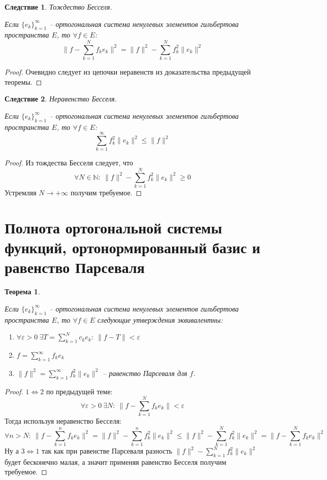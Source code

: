 \documentclass[a4paper,12pt]{article}
\renewcommand{\leq}{\ensuremath{\leqslant}}
\renewcommand{\geq}{\ensuremath{\geqslant}}
\theoremstyle{plain}
\newtheorem{theorem}{Теорема}[section]
\newtheorem*{corollary}{Следствие}
\theoremstyle{definition}
\theoremstyle{remark}
\begin{document}
\begin{corollary}
	Тождество Бесселя.

	Если $\{e_k\}_{k = 1}^\infty$ -- ортогональная система ненулевых элементов гильбертова пространства $E$, то $\forall f \in E$:
	\[\|f - \sum_{k = 1}^N f_ke_k\|^2 = \|f\|^2 - \sum_{k = 1}^Nf_k^2\|e_k\|^2\]
\end{corollary}
\begin{proof}
	Очевидно следует из цепочки неравенств из доказательства предыдущей теоремы.
\end{proof}

\begin{corollary}
	Неравенство Бесселя.

	Если $\{e_k\}_{k = 1}^\infty$ -- ортогональная система ненулевых элементов гильбертова пространства $E$, то $\forall f \in E$:
	\[\sum_{k = 1}^\infty f_k^2 \|e_k\|^2 \leq \|f\|^2\]
\end{corollary}
\begin{proof}
	Из тождества Бесселя следует, что
	\[\forall N \in \mathbb{N}:\: \|f\|^2 - \sum_{k = 1}^Nf_k^2\|e_k\|^2 \geq 0\]
	Устремляя $N \to +\infty$ получим требуемое.
\end{proof}

\section{Полнота ортогональной системы функций, ортонормированный базис и равенство Парсеваля}
\begin{theorem}
	\label{THREE_EQUIV}

	Если $\{e_k\}_{k = 1}^\infty$ -- ортогональная система ненулевых элементов гильбертова пространства $E$, то $\forall f \in E$ следующие утверждения эквивалентны:
	\begin{enumerate}
		\item $\forall \varepsilon > 0 \: \exists T = \sum_{k = 1}^N c_ke_k :\: \|f - T\| < \varepsilon$
		\item $f = \sum_{k = 1}^\infty f_ke_k$
		\item $\|f\|^2 = \sum_{k = 1}^\infty f_k^2 \|e_k\|^2$ -- равенство Парсеваля для $f$.
	\end{enumerate}
\end{theorem}
\begin{proof}
	$1 \Leftrightarrow 2$ по предыдущей теме:
	\[\forall \varepsilon > 0 \: \exists N :\: \|f - \sum_{k = 1}^N f_ke_k\| < \varepsilon\]
	Тогда используя неравенство Бесселя:
	\[\forall n > N :\: \|f - \sum_{k = 1}^n f_ke_k\|^2 = \|f\|^2 - \sum_{k = 1}^n f_k^2\|e_k\|^2 \leq \|f\|^2 - \sum_{k = 1}^N f_k^2\|e_k\|^2 = \|f - \sum_{k = 1}^N f_ke_k\|^2\]
	Ну а $3 \Leftrightarrow 1$ так как при равенстве Парсеваля разность $\|f\|^2 - \sum_{k = 1}^N f_k^2\|e_k\|^2$ будет бесконечно малая, а значит применяя равенство Бесселя получим требуемое.
\end{proof}
\end{document}
